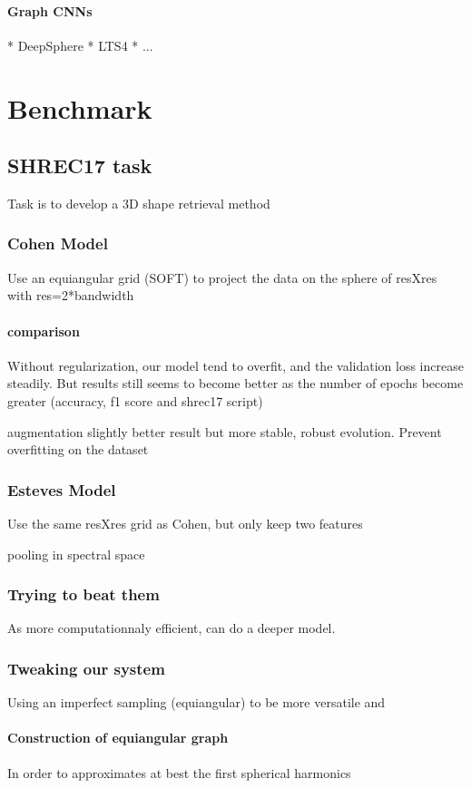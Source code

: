 \documentclass[11pt]{report}
\begin{document}
\subsubsection{Graph CNNs}
* DeepSphere
* LTS4
* ...
\chapter{Benchmark}
\section{SHREC17 task}
Task is to develop a 3D shape retrieval method
\subsection{Cohen Model}
Use an equiangular grid (SOFT) to project the data on the sphere of resXres with res=2*bandwidth

\subsubsection{comparison}
Without regularization, our model tend to overfit, and the validation loss increase steadily. But results still seems to become better as the number of epochs become greater (accuracy, f1 score and shrec17 script)

augmentation slightly better result but more stable, robust evolution. Prevent overfitting on the dataset
\subsection{Esteves Model}
Use the same resXres grid as Cohen, but only keep two features

pooling in spectral space
\subsection{Trying to beat them}
As more computationnaly efficient, can do a deeper model.

\subsection{Tweaking our system}
Using an imperfect sampling (equiangular) to be more versatile and 
\subsubsection{Construction of equiangular graph}
In order to approximates at best the first spherical harmonics
\end{document}
